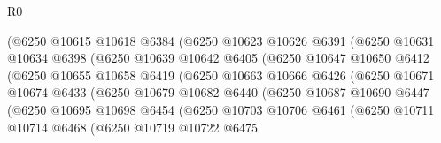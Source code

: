 \begin{lexlean}{R0}
\begin{coremodule}
                          (@6250
                            @10615
                            @10618
                            @6384
                            (@6250
                              @10623
                              @10626
                              @6391
                              (@6250
                                @10631
                                @10634
                                @6398
                                (@6250
                                  @10639
                                  @10642
                                  @6405
                                  (@6250
                                    @10647
                                    @10650
                                    @6412
                                    (@6250
                                      @10655
                                      @10658
                                      @6419
                                      (@6250
                                        @10663
                                        @10666
                                        @6426
                                        (@6250
                                          @10671
                                          @10674
                                          @6433
                                          (@6250
                                            @10679
                                            @10682
                                            @6440
                                            (@6250
                                              @10687
                                              @10690
                                              @6447
                                              (@6250
                                                @10695
                                                @10698
                                                @6454
                                                (@6250
                                                  @10703
                                                  @10706
                                                  @6461
                                                  (@6250
                                                    @10711
                                                    @10714
                                                    @6468
                                                    (@6250
                                                      @10719
                                                      @10722
                                                      @6475

\end{coremodule}
\end{lexlean}
